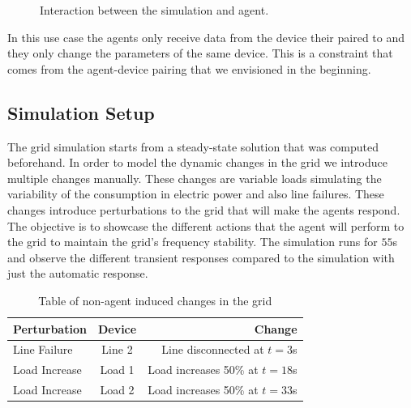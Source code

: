 \documentclass{article}
\begin{document}
\begin{figure}[h]
    \centering
    \caption{Interaction between the simulation and agent.}
    \label{fig:sim_agent_interaction}
\end{figure}

In this use case the agents only receive data from the device their paired to and they only change the parameters of the same device. This is a constraint that comes from the agent-device pairing that we envisioned in the beginning. 

\subsection{Simulation Setup}

The grid simulation starts from a steady-state solution that was computed beforehand. In order to model the dynamic changes in the grid we introduce multiple changes manually. These changes are variable loads simulating the variability of the consumption in electric power and also line failures. These changes introduce perturbations to the grid that will make the agents respond. The objective is to showcase the different actions that the agent will perform to the grid to maintain the grid's frequency stability. The simulation runs for $55$s and observe the different transient responses compared to the simulation with just the automatic response.

\begin{table}[h]
    \centering
    \begin{tabular}{|l|c|r|}
    \hline
    Perturbation & Device & Change \\
    \hline
    Line Failure & Line 2 & Line disconnected at $t =3$s\\
    Load Increase & Load 1 & Load increases 50\% at $t =18$s \\
    Load Increase & Load 2 & Load increases 50\% at $t =33$s \\
    \hline
    \end{tabular}
    \caption{Table of non-agent induced changes in the grid}
    \label{tab:example}
\end{table}
\end{document}

